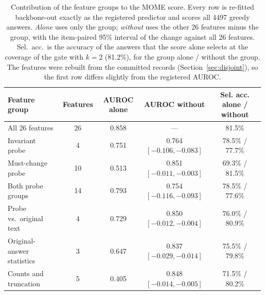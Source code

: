 \begin{table}[t]
\small\setlength{\tabcolsep}{3pt}
\caption{Contribution of the feature groups to the MOME score. Every row is re-fitted backbone-out exactly as the registered predictor and scores all 4497 greedy answers. \emph{Alone} uses only the group; \emph{without} uses the other 26 features minus the group, with the item-paired 95\% interval of the change against all 26 features. Sel.\ acc.\ is the accuracy of the answers that the score alone selects at the coverage of the gate with $k=2$ (81.2\%), for the group alone / without the group. The features were rebuilt from the committed records (Section~\ref{sec:disjoint}), so the first row differs slightly from the registered AUROC.\label{tab:ablation}}
\begin{tabularx}{\textwidth}{lcCCC}
\toprule
\textbf{Feature group} & \textbf{Features} & \textbf{AUROC alone} & \textbf{AUROC without} & \textbf{Sel. acc. alone / without} \\
\midrule
All 26 features & 26 & 0.858 & --- & 81.5\% \\
\midrule
Invariant probe & 4 & 0.751 & 0.764 $[-0.106, -0.083]$ & 78.5\% / 77.7\% \\
Must-change probe & 10 & 0.513 & 0.851 $[-0.011, -0.003]$ & 69.3\% / 81.5\% \\
Both probe groups & 14 & 0.793 & 0.754 $[-0.116, -0.093]$ & 78.5\% / 77.6\% \\
Probe vs.\ original text & 4 & 0.729 & 0.850 $[-0.012, -0.004]$ & 76.0\% / 80.9\% \\
Original-answer statistics & 3 & 0.647 & 0.837 $[-0.029, -0.014]$ & 75.5\% / 79.8\% \\
Counts and truncation & 5 & 0.405 & 0.848 $[-0.014, -0.005]$ & 71.5\% / 80.2\% \\
\bottomrule
\end{tabularx}
\end{table}
